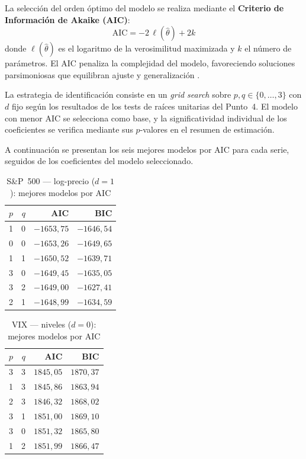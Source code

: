 \documentclass[12pt, a4paper]{article}
\begin{document}
La selección del orden óptimo del modelo se realiza mediante el \textbf{Criterio de Información de Akaike (AIC)}:
$$\text{AIC} = -2\,\ell(\hat{\theta}) + 2k$$
donde $\ell(\hat{\theta})$ es el logaritmo de la verosimilitud maximizada y $k$ el número de parámetros. El AIC penaliza la complejidad del modelo, favoreciendo soluciones parsimoniosas que equilibran ajuste y generalización \cite{diebold2007}.

La estrategia de identificación consiste en un \textit{grid search} sobre $p, q \in \{0,\ldots,3\}$ con $d$ fijo según los resultados de los tests de raíces unitarias del Punto~4. El modelo con menor AIC se selecciona como base, y la significatividad individual de los coeficientes se verifica mediante sus $p$-valores en el resumen de estimación.

A continuación se presentan los seis mejores modelos por AIC para cada serie, seguidos de los coeficientes del modelo seleccionado.

\begin{table}[H]
    \centering
    \caption{S\&P~500 — log-precio ($d=1$): mejores modelos por AIC}
    \label{tab:aic_sp500}
    \begin{tabular}{rrrr}
        \toprule
        $p$ & $q$ & AIC & BIC \\
        \midrule
        1 & 0 & $-1653{,}75$ & $-1646{,}54$ \\
        0 & 0 & $-1653{,}26$ & $-1649{,}65$ \\
        1 & 1 & $-1650{,}52$ & $-1639{,}71$ \\
        3 & 0 & $-1649{,}45$ & $-1635{,}05$ \\
        3 & 2 & $-1649{,}00$ & $-1627{,}41$ \\
        2 & 1 & $-1648{,}99$ & $-1634{,}59$ \\
        \bottomrule
    \end{tabular}
\end{table}

\begin{table}[H]
    \centering
    \caption{VIX — niveles ($d=0$): mejores modelos por AIC}
    \label{tab:aic_vix}
    \begin{tabular}{rrrr}
        \toprule
        $p$ & $q$ & AIC & BIC \\
        \midrule
        3 & 3 & $1845{,}05$ & $1870{,}37$ \\
        1 & 3 & $1845{,}86$ & $1863{,}94$ \\
        2 & 3 & $1846{,}32$ & $1868{,}02$ \\
        3 & 1 & $1851{,}00$ & $1869{,}10$ \\
        3 & 0 & $1851{,}32$ & $1865{,}80$ \\
        1 & 2 & $1851{,}99$ & $1866{,}47$ \\
        \bottomrule
    \end{tabular}
\end{table}
\end{document}
